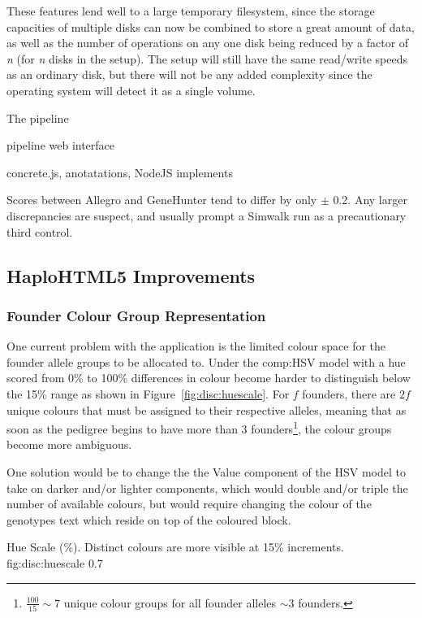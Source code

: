 These features lend well to a large temporary filesystem, since the storage capacities of multiple disks can now be combined to store a great amount of data, as well as the number of operations on any one disk being reduced by a factor of \textit{n} (for \textit{n} disks in the setup). The setup will still have the same read/write speeds as an ordinary disk, but there will not be any added complexity since the operating system will detect it as a single volume.


The pipeline

pipeline web interface

concrete.js, anotatations, NodeJS implements



Scores between Allegro and GeneHunter tend to differ by only $\pm$ 0.2. Any larger discrepancies are suspect, and usually prompt a Simwalk run as a precautionary third control.




\subsection{HaploHTML5 Improvements}

\subsubsection{Founder Colour Group Representation}
One current problem with the application is the limited colour space for the founder allele groups to be allocated to. Under the \gls{comp:HSV} model with a hue scored from 0\% to 100\% differences in colour become harder to distinguish below the 15\% range as shown in Figure~\ref{fig:disc:huescale}. For $f$ founders, there are $2f$ unique colours that must be assigned to their respective alleles, meaning that as soon as the pedigree begins to have more than 3 founders\footnote{$ \frac{100}{15} \sim 7 $ unique colour groups for all founder alleles $ \sim 3$ founders.}, the colour groups become more ambiguous.

One solution would be to change the the Value component of the HSV model to take on darker and/or lighter components, which would double and/or triple the number of available colours, but would require changing the colour of the genotypes text which reside on top of the coloured block. 

{Hue Scale (\%). Distinct colours are more visible at 15\% increments.}
{fig:disc:huescale}
{0.7}{}

